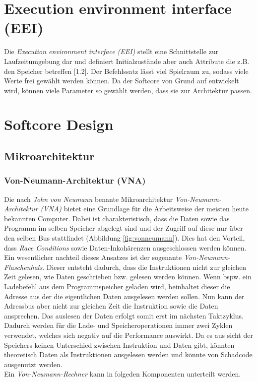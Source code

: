     \section{Execution environment interface (EEI)}\label{lab:eei}
        Die \textit{Execution environment interface (EEI)} stellt eine Schnittstelle zur Laufzeitumgebung
        dar und definiert Initialzustände aber auch Attribute die z.B. den Speicher betreffen \cite{riscv-isa-specs}[1.2].
        Der Befehlssatz lässt viel Spielraum zu, sodass viele Werte frei gewählt werden können.
        Da der Softcore von Grund auf entwickelt wird, können viele Parameter so gewählt werden, dass sie zur Architektur passen.


    \section{Softcore Design}

        \subsection{Mikroarchitektur}
                \subsubsection{Von-Neumann-Architektur (VNA)}
                    Die nach \textit{John von Neumann} benante Mikroarchitektur \textit{Von-Neumann-Architektur (VNA)}
                    bietet eine Grundlage für die Arbeitsweise der meisten heute bekannten Computer.
                    Dabei ist charakteristisch, dass die Daten sowie das Programm im selben Speicher abgelegt sind und
                    der Zugriff auf diese nur über den selben Bus stattfindet (Abbildung \ref{fig:vonneumann}).
                    Dies hat den Vorteil, dass \textit{Race Conditions} sowie Daten-Inkohärenzen ausgeschlossen werden können.
                    Ein wesentlicher nachteil dieses Ansatzes ist der sogenante \textit{Von-Neumann-Flaschenhals}.
                    Dieser entsteht dadurch, dass die Instruktionen nicht zur gleichen Zeit gelesen,
                    wie Daten geschrieben bzw. gelesen werden können. Wenn bspw. ein Ladebefehl aus dem Programmspeicher
                    geladen wird, beinhaltet dieser die Adresse aus der die eigentlichen Daten ausgelesen werden sollen.
                    Nun kann der Adressbus aber nicht zur gleichen Zeit die Instruktion sowie die Daten ansprechen.
                    Das auslesen der Daten erfolgt somit erst im nächsten Taktzyklus. Dadurch werden für
                    die Lade- und Speicheroperationen immer zwei Zyklen verwendet, welches sich
                    negativ auf die Performance auswirkt.
                    Da es aus sicht der Speichers keinen Unterschied zwischen Instruktion und Daten gibt,
                    könnten theoretisch Daten als Instruktionen ausgelesen werden und könnte von Schadcode ausgenutzt werden.\\
                    Ein \textit{Von-Neumann-Rechner} kann in folgeden Komponenten unterteilt werden.

